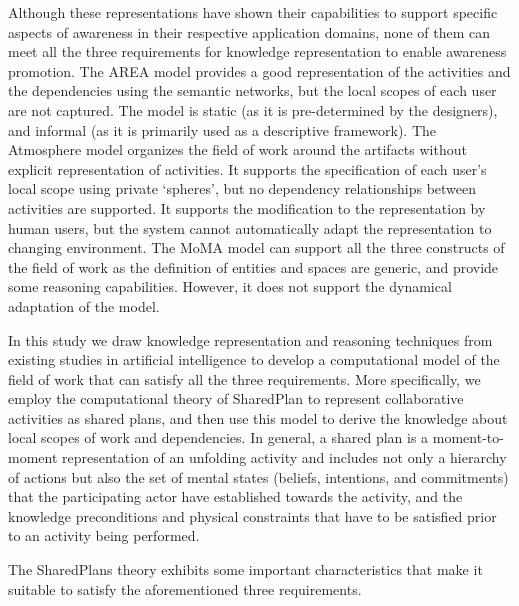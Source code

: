 Although these representations have shown their capabilities to support specific aspects of awareness in their respective application domains, none of them can meet all the three requirements for knowledge representation to enable awareness promotion. The AREA model provides a good representation of the activities and the dependencies using the semantic networks, but the local scopes of each user are not captured. The model is static (as it is pre-determined by the designers), and informal (as it is primarily used as a descriptive framework). The Atmosphere model organizes the field of work around the artifacts without explicit representation of activities. It supports the specification of each user's local scope using private `spheres', but no dependency relationships between activities are supported. It supports the modification to the representation by human users, but the system cannot automatically adapt the representation to changing environment. The MoMA model can support all the three constructs of the field of work as the definition of entities and spaces are generic, and provide some reasoning capabilities. However, it does not support the dynamical adaptation of the model.

In this study we draw knowledge representation and reasoning techniques from existing studies in artificial intelligence to develop a computational model of the field of work that can satisfy all the three requirements. More specifically, we employ the computational theory of SharedPlan \cite{grosz1996collaborative} to represent collaborative activities as shared plans, and then use this model to derive the knowledge about local scopes of work and dependencies. In general, a shared plan is a moment-to-moment representation of an unfolding activity and includes not only a hierarchy of actions but also the set of mental states (beliefs, intentions, and commitments) that the participating actor have established towards the activity, and the knowledge preconditions and physical constraints that have to be satisfied prior to an activity being performed. 

The SharedPlans theory exhibits some important characteristics that make it suitable to satisfy the aforementioned three requirements.

